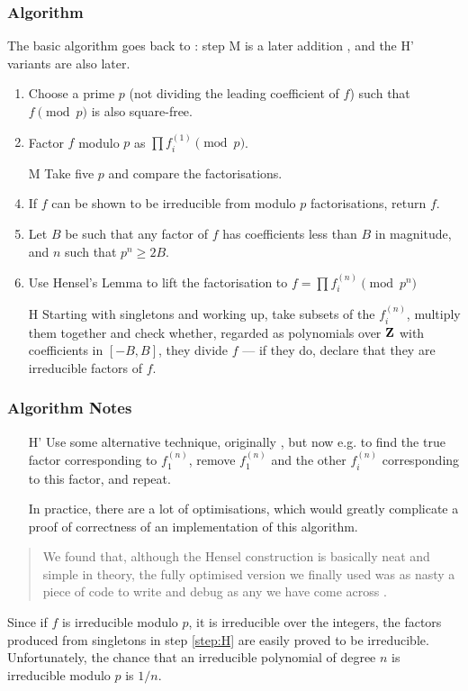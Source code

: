 \documentclass[handout]{beamer}   %
\begin{document}
\begin{frame}[fragile]
\frametitle{Algorithm}
The basic algorithm goes back to \cite{Zassenhaus1969}: step M is a later addition \cite{Musser1975a}, and the  H' variants are also later.
\begin{enumerate}
\item Choose a prime $p$ (not dividing the leading coefficient of $f$) such that $f\pmod p$ is also square-free.
\item\label{step:p} Factor $f$ modulo $p$ as $\prod f_i^{(1)} \pmod p$.
\item[M]Take five $p$ and compare the factorisations.
\item If $f$ can be shown to be irreducible from modulo $p$ factorisations, return $f$.
\item Let $B$ be such that any factor of $f$ has coefficients less than $B$ in magnitude, and $n$ such that $p^n\ge 2B$.
\item Use Hensel's Lemma to lift the factorisation to $f=\prod f_i^{(n)} \pmod {p^n}$
\item[H]\label{step:H} Starting with singletons and working up, take subsets of the $f_i^{(n)}$, multiply them together and check whether, regarded as polynomials over ${\bf Z}$ with coefficients in $[-B,B]$, they divide $f$ --- if they do, declare that they are irreducible factors of $f$.
\end{enumerate}
\end{frame}
\begin{frame}[fragile]
\frametitle{Algorithm Notes}
\begin{enumerate}[<+->]\item[H']\label{step:H'}Use some alternative technique, originally \cite{Lenstraetal1982}, but now e.g. \cite{Abbottetal2000a,Hartetal2011a} to find the true factor corresponding to $f_1^{(n)}$, remove $f_1^{(n)}$ and the other $f_i^{(n)}$ corresponding to this factor, and repeat.
\item[\dbend]In practice, there are a lot of optimisations, which would greatly complicate a proof of correctness of an implementation of this algorithm.
\end{enumerate}
\pause
\begin{quote}
We found that, although the Hensel construction is basically neat and simple in theory,
the fully optimised version we finally used was as nasty a piece of code to write and
debug as any we have come across \cite{MooreNorman1981}.
\end{quote}
\pause
Since if $f$ is irreducible modulo $p$, it is irreducible over the integers, the factors produced from singletons in step \ref{step:H} are easily proved to be irreducible.  Unfortunately, the chance that an irreducible polynomial of degree $n$ is irreducible modulo $p$ is $1/n$.
\end{frame}
\end{document}
